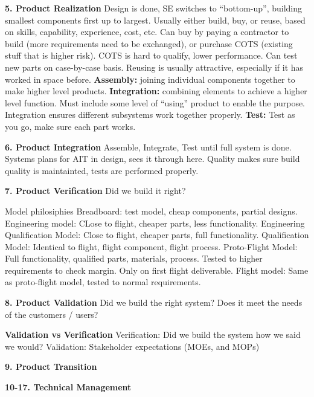 \documentclass[letterpaper, 8pt]{extarticle}
\begin{document}
\begin{multicols*}{5}
\textbf{5. Product Realization}
Design is done, SE switches to ``bottom-up'',
building smallest components first up to largest.
Usually either build, buy, or reuse, based on skills, capability, experience, cost, etc.
Can buy by paying a contractor to build (more requirements need to be exchanged),
or purchase COTS (existing stuff that is higher risk).
COTS is hard to qualify, lower performance. Can test new parts on case-by-case basis.
Reusing is usually attractive, especially if it has worked in space before.
\textbf{Assembly:} joining individual components together to make higher level products.
\textbf{Integration:} combining elements to achieve a higher level function. Must include some level of ``using'' product to enable the purpose.
Integration ensures different subsystems work together properly.
\textbf{Test:} Test as you go, make sure each part works.

\textbf{6. Product Integration}
Assemble, Integrate, Test until full system is done.
Systems plans for AIT in design, sees it through here.
Quality makes sure build quality is maintainted, tests are performed properly.

\textbf{7. Product Verification}
Did we build it right?

Model philosiphies
Breadboard: test model, cheap components, partial designs.
Engineering model: CLose to flight, cheaper parts, less functionality.
Engineering Qualification Model: Close to flight, cheaper parts, full functionality.
Qualification Model: Identical to flight, flight component, flight process.
Proto-Flight Model: Full functionality, qualified parts, materials, process.
Tested to higher requirements to check margin.
Only on first flight deliverable.
Flight model: Same as proto-flight model, tested to normal requirements.

\textbf{8. Product Validation}
Did we build the right system?
Does it meet the needs of the customers / users?

\textbf{Validation vs Verification}
Verification: Did we build the system how we said we would?
Validation: Stakeholder expectations (MOEs, and MOPs)

\textbf{9. Product Transition}

\textbf{10-17. Technical Management}


\end{multicols*}
\end{document}
